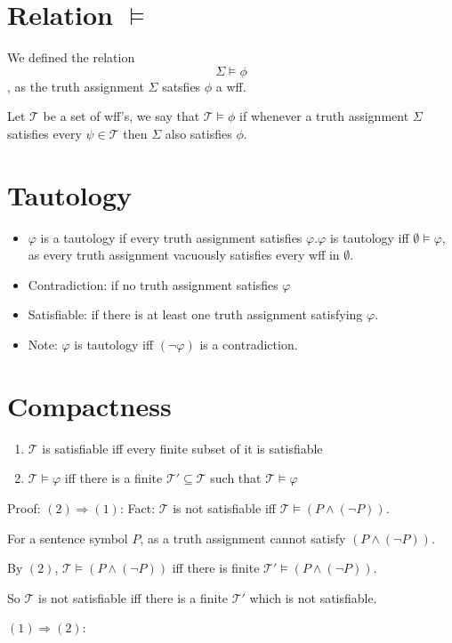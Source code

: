\documentclass[11pt]{article}
\begin{document}
	\section{Relation $\models$}
	We defined the relation
	\[\Sigma \models \phi\], as the truth assignment $\Sigma$ satsfies $\phi$ a wff.
	
	Let $\mathcal{T}$ be a set of wff's, we say that $\mathcal{T} \models \phi$ if whenever a truth assignment $\Sigma$ satisfies every $\psi \in \mathcal{T}$ then $\Sigma$ also satisfies $\phi$.
	
	\section{Tautology}
	\begin{itemize}
		\item $\varphi$ is a tautology if every truth assignment satisfies $\varphi$.$\varphi$ is tautology iff $\emptyset \models \varphi$, as every truth assignment vacuously satisfies every wff in $\emptyset$.
		\item Contradiction: if no truth assignment satisfies $\varphi$
		\item Satisfiable: if there is at least one truth assignment satisfying $\varphi$.

		\item Note: $\varphi$ is tautology iff $(\neg \varphi)$ is a contradiction.
	\end{itemize}
	
	\section{Compactness}
	\begin{enumerate}
		\item $\mathcal{T}$ is satisfiable iff every finite subset of it is satisfiable
		\item $\mathcal{T} \models \varphi$ iff there is a finite $\mathcal{T}' \subseteq \mathcal{T}$ such that $\mathcal{T} \models \varphi$
	\end{enumerate}
	
	Proof: 
	$(2) \Rightarrow (1)$:
	Fact: $\mathcal{T}$ is not satisfiable iff $\mathcal{T} \models (P \wedge (\neg P))$.
	
	For a sentence symbol $P$, as a truth assignment cannot satisfy $(P \wedge (\neg P))$. 
	
	By $(2)$, $\mathcal{T} \models (P \wedge (\neg P))$ iff there is finite $\mathcal{T}' \models (P \wedge (\neg P))$.
	
	So $\mathcal{T}$ is not satisfiable iff there is a finite $\mathcal{T}'$ which is not satisfiable.
	
	$(1) \Rightarrow (2)$:
\end{document}
